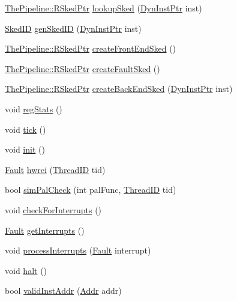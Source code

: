 \begin{DoxyCompactItemize}
\item 
\hyperlink{classResourceSked}{ThePipeline::RSkedPtr} \hyperlink{classInOrderCPU_aa8266c7a3d7b7965c585f9826c0d48f4}{lookupSked} (\hyperlink{classRefCountingPtr}{DynInstPtr} inst)
\item 
\hyperlink{classInOrderCPU_a630137ef811336d3ee312e01adb43991}{SkedID} \hyperlink{classInOrderCPU_a1c1ffb2917eb8fd5d147568b3a9ed49d}{genSkedID} (\hyperlink{classRefCountingPtr}{DynInstPtr} inst)
\item 
\hyperlink{classResourceSked}{ThePipeline::RSkedPtr} \hyperlink{classInOrderCPU_a58dbbb906338dea36ff442d23c1e576d}{createFrontEndSked} ()
\item 
\hyperlink{classResourceSked}{ThePipeline::RSkedPtr} \hyperlink{classInOrderCPU_ab4e3b37bc6ae8d0dde3a66c9a8b28874}{createFaultSked} ()
\item 
\hyperlink{classResourceSked}{ThePipeline::RSkedPtr} \hyperlink{classInOrderCPU_a431a92852eabc4329954c5f2ad9c5cf5}{createBackEndSked} (\hyperlink{classRefCountingPtr}{DynInstPtr} inst)
\item 
void \hyperlink{classInOrderCPU_a4dc637449366fcdfc4e764cdf12d9b11}{regStats} ()
\item 
void \hyperlink{classInOrderCPU_a873dd91783f9efb4a590aded1f70d6b0}{tick} ()
\item 
void \hyperlink{classInOrderCPU_a02fd73d861ef2e4aabb38c0c9ff82947}{init} ()
\item 
\hyperlink{classRefCountingPtr}{Fault} \hyperlink{classInOrderCPU_a3820de4f7e76b56c6d795f27bf49c097}{hwrei} (\hyperlink{base_2types_8hh_ab39b1a4f9dad884694c7a74ed69e6a6b}{ThreadID} tid)
\item 
bool \hyperlink{classInOrderCPU_a875eebdeba298f450fe84b0a05349afe}{simPalCheck} (int palFunc, \hyperlink{base_2types_8hh_ab39b1a4f9dad884694c7a74ed69e6a6b}{ThreadID} tid)
\item 
void \hyperlink{classInOrderCPU_afc6b0526014df091373ec2c850508a55}{checkForInterrupts} ()
\item 
\hyperlink{classRefCountingPtr}{Fault} \hyperlink{classInOrderCPU_aa2bbcc75bdfc0f2355cd06731e6f5d69}{getInterrupts} ()
\item 
void \hyperlink{classInOrderCPU_ac3b13f31ae4a2de2b647e09c37a10822}{processInterrupts} (\hyperlink{classRefCountingPtr}{Fault} interrupt)
\item 
void \hyperlink{classInOrderCPU_ade0430439247877006d7df950f94918a}{halt} ()
\item 
bool \hyperlink{classInOrderCPU_af5f6a59bc2ed83b0cf9203ba8c63bf34}{validInstAddr} (\hyperlink{base_2types_8hh_af1bb03d6a4ee096394a6749f0a169232}{Addr} addr)

\end{DoxyCompactItemize}
